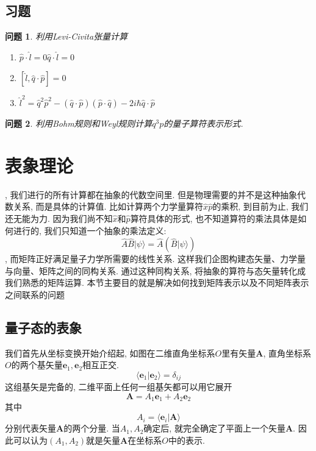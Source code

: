 \documentclass[a4paper,11pt]{book}
\newtheorem{problem}{问题}[section]
\newcommand{\A}{\hat{A}}
\newcommand{\B}{\hat{B}}
\newcommand{\x}{\hat{x}}
\newcommand{\p}{\hat{p}}
\newcommand{\q}{\hat{q}}
\newcommand{\hl}{\hat{l}}
\begin{document}
\subsection{习题}
\begin{problem}
  利用Levi-Civita张量计算
  \begin{enumerate}
    \item $\p\cdot\hl=0$\quad$\q\cdot\hl=0$
    \item $[\hl,\q\cdot\p]=0$
    \item $\hl^2=\q^2\p^2-(\q\cdot\p)(\p\cdot\q)-2i\hbar\q\cdot\p$
  \end{enumerate}
\end{problem}
\begin{problem}
  利用Bohm规则和Weyl规则计算$q^3p$的量子算符表示形式.
\end{problem}
\section{表象理论}
, 我们进行的所有计算都在抽象的代数空间里. 但是物理需要的并不是这种抽象代数关系, 而是具体的计算值. 比如计算两个力学量算符$\x\p$的乘积, 到目前为止, 我们还无能为力. 因为我们尚不知$\x$和$\p$算符具体的形式, 也不知道算符的乘法具体是如何进行的, 我们只知道一个抽象的乘法定义:
\begin{equation*}
  \A\B|\psi\rangle=\A(\B|\psi\rangle)
\end{equation*}
, 而矩阵正好满足量子力学所需要的线性关系. 这样我们企图构建态矢量、力学量与向量、矩阵之间的同构关系. 通过这种同构关系, 将抽象的算符与态矢量转化成我们熟悉的矩阵运算. 本节主要目的就是解决如何找到矩阵表示以及不同矩阵表示之间联系的问题
\subsection{量子态的表象}
我们首先从坐标变换开始介绍起, 如图在二维直角坐标系$O$里有矢量$\mathbf{A}$, 直角坐标系$O$的两个基矢量$\mathbf{e}_1,\mathbf{e}_2$相互正交.
\begin{equation*}
  \langle \mathbf{e}_1|\mathbf{e}_2\rangle=\delta_{ij}
\end{equation*}
这组基矢是完备的, 二维平面上任何一组基矢都可以用它展开
\begin{equation*}
  \mathbf{A}=A_1\mathbf{e}_1+A_2\mathbf{e}_2
\end{equation*}
其中
\begin{equation*}
  A_i=\langle\mathbf{e}_i|\mathbf{A}\rangle
\end{equation*}
分别代表矢量$\mathbf{A}$的两个分量. 当$A_1,A_2$确定后, 就完全确定了平面上一个矢量$\mathbf{A}$. 因此可以认为$(A_1,A_2)$就是矢量$\mathbf{A}$在坐标系$O$中的表示.
\end{document}
